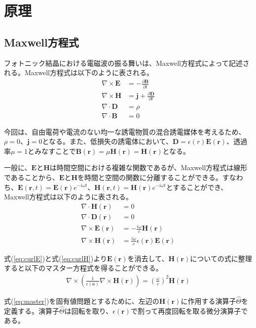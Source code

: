 \documentclass[platex,dvipdfmx,draft]{jsreport}
\numberwithin{equation}{section}
\begin{document}
\chapter{原理}
\section{Maxwell方程式}
フォトニック結晶における電磁波の振る舞いは、Maxwell方程式によって記述される。Maxwell方程式は以下のように表される。
\begin{align}
  \nabla \times \bm{E} &= -\frac{\partial \bm{B}}{\partial t} \\
  \nabla \times \bm{H} &= \bm{j} + \frac{\partial \bm{D}}{\partial t} \\
  \nabla \cdot \bm{D} &= \rho \\
  \nabla \cdot \bm{B} &= 0
\end{align}

今回は、自由電荷や電流のない均一な誘電物質の混合誘電媒体を考えるため、$\rho = 0$、$\bm{j} = 0$となる。また、低損失の誘電体において、$\bm{D} = \epsilon(r) \bm{E}(\bm{r})$、透過率$\mu = 1$とみなすことで$\bm{B}(\bm{r}) = \mu \bm{H}(\bm{r}) = \bm{H}(\bm{r})$となる。

一般に、$\bm{E}$と$\bm{H}$は時間空間における複雑な関数であるが、Maxwell方程式は線形であることから、$\bm{E}$と$\bm{H}$を時間と空間の関数に分離することができる。すなわち、$\bm{E}(\bm{r},t) = \bm{E}(\bm{r}) e^{-i\omega t}$、$\bm{H}(\bm{r},t) = \bm{H}(\bm{r}) e^{-i\omega t}$とすることができ、Maxwell方程式は以下のように表される。
\begin{align}
  \nabla \cdot \bm{H}(\bm{r}) &= 0 \\
  \nabla \cdot \bm{D}(\bm{r}) &= 0 \\
  \label{eq:curlE}
  \nabla \times \bm{E}(\bm{r}) &= - \frac{i \omega}{c} \bm{H}(\bm{r}) \\
  \label{eq:curlH}
  \nabla \times \bm{H} (\bm{r}) &= \frac{i \omega}{c} \epsilon(\bm{r}) \bm{E}(\bm{r})
\end{align}

式(\ref{eq:curlE})と式(\ref{eq:curlH})より$\bm{E}(\bm{r})$を消去して、$\bm{H}(\bm{r})$についての式に整理すると以下のマスター方程式を得ることができる。
\begin{align}
  \label{eq:master}
  \nabla \times \left( \frac{1}{\epsilon (\bm{e})} \nabla \times \bm{H}(\bm{r}) \right) = \left( \frac{\omega}{c} \right)^2 \bm{H}(\bm{r}) 
\end{align}

式(\ref{eq:master})を固有値問題とするために、左辺の$\bm{H}(\bm{r})$に作用する演算子$\hat{\Theta}$を定義する。演算子$\hat{\Theta}$は回転を取り、$\epsilon(\bm{r})$で割って再度回転を取る微分演算子である。
\end{document}
